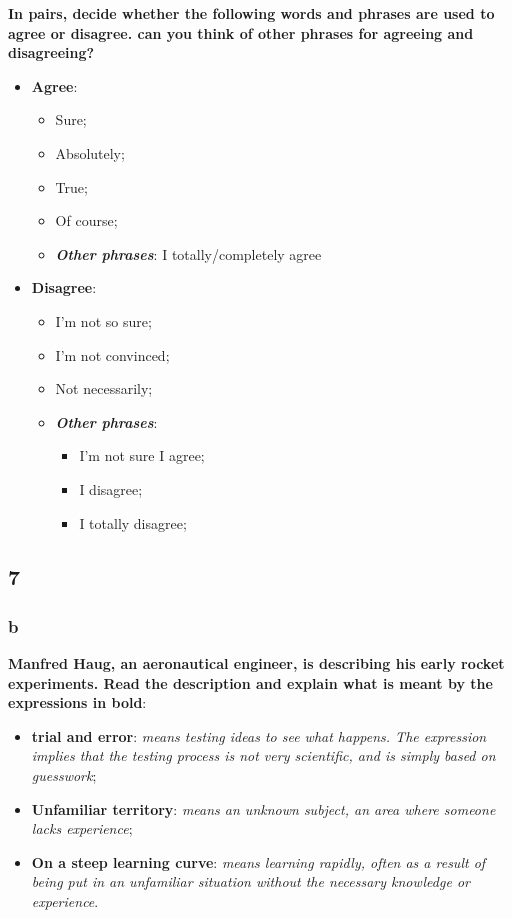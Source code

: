 \textbf{In pairs, decide whether the following words and phrases are used to agree or disagree. can you think of other phrases for agreeing and disagreeing?}

\begin{itemize}

\item\textbf{Agree}:
\begin{itemize}
\item Sure;
\item Absolutely;
\item True;
\item Of course;
\item\textbf{\textit{Other phrases}}: I totally/completely agree
\end{itemize}

\item\textbf{Disagree}:
\begin{itemize}
\item I'm not so sure;
\item I'm not convinced;
\item Not necessarily;
\item\textbf{\textit{Other phrases}}:
\begin{itemize}
\item I'm not sure I agree;
\item I disagree;
\item I totally disagree;
\end{itemize}
\end{itemize}

\end{itemize}

\subsection{7}

\subsubsection{b}

\textbf{Manfred Haug, an aeronautical engineer, is describing his early rocket experiments. Read the description and explain what is meant by the expressions in bold}:

\begin{itemize}

\item\textbf{trial and error}: \textit{means testing ideas to see what happens. The expression implies that the testing process is not very scientific, and is simply based on guesswork};
\item\textbf{Unfamiliar territory}: \textit{means an unknown subject, an area where someone lacks experience};
\item\textbf{On a steep learning curve}: \textit{means learning rapidly, often as a result of being put in an unfamiliar situation without the necessary knowledge or experience}.

\end{itemize}

